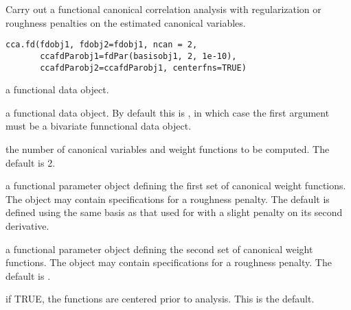\documentclass{article}
\begin{document}
\begin{Description}\relax
Carry out a functional canonical correlation analysis with
regularization or roughness penalties on the estimated
canonical variables.
\end{Description}
\begin{Usage}
\begin{verbatim}
cca.fd(fdobj1, fdobj2=fdobj1, ncan = 2,
       ccafdParobj1=fdPar(basisobj1, 2, 1e-10),
       ccafdParobj2=ccafdParobj1, centerfns=TRUE)
\end{verbatim}
\end{Usage}
\begin{Arguments}
\begin{ldescription}
\item[\code{fdobj1}] a functional data object.

\item[\code{fdobj2}] a functional data object.  By default this is , in
which case the first argument must be a bivariate funnctional data
object.

\item[\code{ncan}] the number of canonical variables and weight functions to be
computed.  The default is 2.

\item[\code{ccafdParobj1}] a functional parameter object defining the first set of canonical
weight functions.  The object may contain specifications for a
roughness penalty. The default is defined using the same basis
as that used for  with a slight penalty on its
second derivative.

\item[\code{ccafdParobj2}] a functional parameter object defining the second set of canonical
weight functions.  The object may contain specifications for a
roughness penalty. The default is .

\item[\code{centerfns}] if TRUE, the functions are centered prior to analysis. This is the
default.

\end{ldescription}
\end{Arguments}
\end{document}
